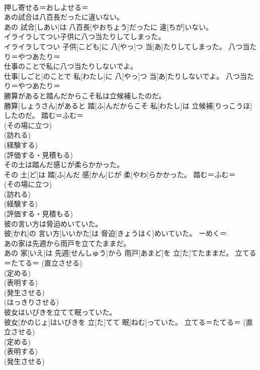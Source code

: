 \documentclass[8pt]{extreport}
\begin{document}
\begin{CJK}{UTF8}{min}
{\\	押し寄せる＝おしよせる＝ 
\\	あの試合は八百長だったに違いない。	
\\	あの 試合[しあい]は 八百長[やおちょう]だったに 違[ちが]いない。	
\\	イライラしてつい子供に八つ当たりしてしまった。	
\\	イライラしてつい 子供[こども]に 八[やっ]つ 当[あ]たりしてしまった。	八つ当たり＝やつあたり＝ 
\\	仕事のことで私に八つ当たりしないでよ。	
\\	仕事[しごと]のことで 私[わたし]に 八[やっ]つ 当[あ]たりしないでよ。	八つ当たり＝やつあたり＝ 
\\	勝算があると踏んだからこそ私は立候補したのだ。	
\\	勝算[しょうさん]があると 踏[ふ]んだからこそ 私[わたし]は 立候補[りっこうほ]したのだ。	踏む＝ふむ＝ 
\\	(その場に立つ) 
\\	(訪れる) 
\\	(経験する) 
\\	(評価する・見積もる) 
\\	その土は踏んだ感じが柔らかかった。	
\\	その 土[ど]は 踏[ふ]んだ 感[かん]じが 柔[やわ]らかかった。	踏む＝ふむ＝ 
\\	(その場に立つ) 
\\	(訪れる) 
\\	(経験する) 
\\	(評価する・見積もる) 
\\	彼の言い方は脅迫めいていた。	
\\	彼[かれ]の 言い方[いいかた]は 脅迫[きょうはく]めいていた。	ーめく＝ 
\\	あの家は先週から雨戸を立てたままだ。	
\\	あの 家[いえ]は 先週[せんしゅう]から 雨戸[あまど]を 立[た]てたままだ。	立てる＝たてる＝ (直立させる) 
\\	(定める) 
\\	(表明する) 
\\	(発生させる) 
\\	(はっきりさせる) 
\\	彼女はいびきを立てて眠っていた。	
\\	彼女[かのじょ]はいびきを 立[た]てて 眠[ねむ]っていた。	立てる＝たてる＝ (直立させる) 
\\	(定める) 
\\	(表明する) 
\\	(発生させる) 
}
\end{CJK}
\end{document}
